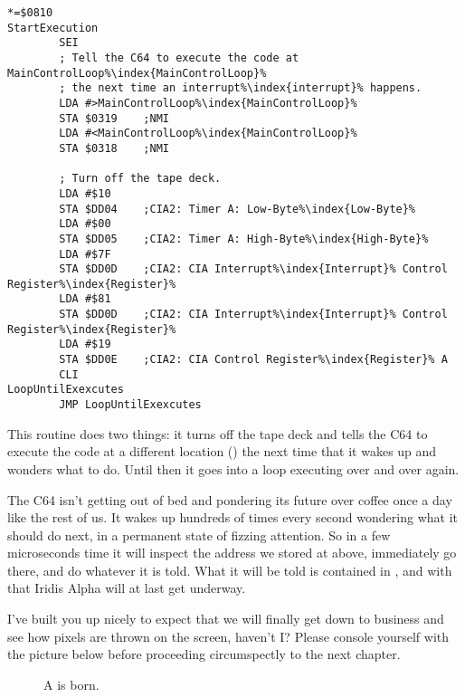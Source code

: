 \begin{lstlisting}[caption=The first piece of code that is executed in Iridis Alpha.,escapechar=\%]
*=$0810
StartExecution
        SEI
        ; Tell the C64 to execute the code at MainControlLoop%\index{MainControlLoop}%
        ; the next time an interrupt%\index{interrupt}% happens.
        LDA #>MainControlLoop%\index{MainControlLoop}%
        STA $0319    ;NMI
        LDA #<MainControlLoop%\index{MainControlLoop}%
        STA $0318    ;NMI

        ; Turn off the tape deck.
        LDA #$10
        STA $DD04    ;CIA2: Timer A: Low-Byte%\index{Low-Byte}%
        LDA #$00
        STA $DD05    ;CIA2: Timer A: High-Byte%\index{High-Byte}%
        LDA #$7F
        STA $DD0D    ;CIA2: CIA Interrupt%\index{Interrupt}% Control Register%\index{Register}%
        LDA #$81
        STA $DD0D    ;CIA2: CIA Interrupt%\index{Interrupt}% Control Register%\index{Register}%
        LDA #$19
        STA $DD0E    ;CIA2: CIA Control Register%\index{Register}% A
        CLI
LoopUntilExexcutes
        JMP LoopUntilExexcutes
\end{lstlisting}

This routine does two things: it turns off the tape deck and tells the C64 to execute the code at a different
location () the next time that it wakes up and wonders what to do. Until then it 
goes into a loop executing  over and over again.

The C64 isn't getting out of bed and pondering its future over coffee once a day like the rest of us. It wakes up hundreds of times every second
wondering what it should do next, in a permanent state of fizzing attention. So in a few microseconds time it will inspect the address we stored
at  above, immediately go there, and do whatever it is told. What it will be told is contained in , 
and with that Iridis Alpha will at last get underway.

I've built you up nicely to expect that we will finally get down to business and see how pixels are thrown on the screen, haven't I? Please console yourself
with the picture below before proceeding circumspectly to the next chapter.
 
\begin{figure}[H]
  {
    \begin{adjustbox}{width=10cm,center}
    \end{adjustbox}
  }\caption[]{A  is born.}
\end{figure}


